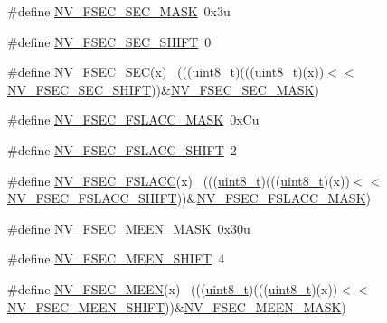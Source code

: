 \begin{DoxyCompactItemize}
\item 
\#define \hyperlink{group___n_v___register___masks_gab159c721c6cde1f629b630c573da8ea9}{N\+V\+\_\+\+F\+S\+E\+C\+\_\+\+S\+E\+C\+\_\+\+M\+A\+SK}~0x3u
\item 
\#define \hyperlink{group___n_v___register___masks_ga92a819b24b0472a83857ddd2d950ab08}{N\+V\+\_\+\+F\+S\+E\+C\+\_\+\+S\+E\+C\+\_\+\+S\+H\+I\+FT}~0
\item 
\#define \hyperlink{group___n_v___register___masks_gad5a8a12d54435f49c62b7f43b53513a8}{N\+V\+\_\+\+F\+S\+E\+C\+\_\+\+S\+EC}(x)                                                  ~(((\hyperlink{_p_e___types_8h_aba7bc1797add20fe3efdf37ced1182c5}{uint8\+\_\+t})(((\hyperlink{_p_e___types_8h_aba7bc1797add20fe3efdf37ced1182c5}{uint8\+\_\+t})(x))$<$$<$\hyperlink{group___n_v___register___masks_ga92a819b24b0472a83857ddd2d950ab08}{N\+V\+\_\+\+F\+S\+E\+C\+\_\+\+S\+E\+C\+\_\+\+S\+H\+I\+FT}))\&\hyperlink{group___n_v___register___masks_gab159c721c6cde1f629b630c573da8ea9}{N\+V\+\_\+\+F\+S\+E\+C\+\_\+\+S\+E\+C\+\_\+\+M\+A\+SK})
\item 
\#define \hyperlink{group___n_v___register___masks_ga8fd3b6696c82aa96017fe25be34d19c9}{N\+V\+\_\+\+F\+S\+E\+C\+\_\+\+F\+S\+L\+A\+C\+C\+\_\+\+M\+A\+SK}~0x\+Cu
\item 
\#define \hyperlink{group___n_v___register___masks_gaba549ee99b8ca1af3531eafd5746f6b6}{N\+V\+\_\+\+F\+S\+E\+C\+\_\+\+F\+S\+L\+A\+C\+C\+\_\+\+S\+H\+I\+FT}~2
\item 
\#define \hyperlink{group___n_v___register___masks_gae4a6264735dd8537ff6a3a993a8c50d8}{N\+V\+\_\+\+F\+S\+E\+C\+\_\+\+F\+S\+L\+A\+CC}(x)                                            ~(((\hyperlink{_p_e___types_8h_aba7bc1797add20fe3efdf37ced1182c5}{uint8\+\_\+t})(((\hyperlink{_p_e___types_8h_aba7bc1797add20fe3efdf37ced1182c5}{uint8\+\_\+t})(x))$<$$<$\hyperlink{group___n_v___register___masks_gaba549ee99b8ca1af3531eafd5746f6b6}{N\+V\+\_\+\+F\+S\+E\+C\+\_\+\+F\+S\+L\+A\+C\+C\+\_\+\+S\+H\+I\+FT}))\&\hyperlink{group___n_v___register___masks_ga8fd3b6696c82aa96017fe25be34d19c9}{N\+V\+\_\+\+F\+S\+E\+C\+\_\+\+F\+S\+L\+A\+C\+C\+\_\+\+M\+A\+SK})
\item 
\#define \hyperlink{group___n_v___register___masks_ga02f5aa86e1f5bceefd0378fa736d5656}{N\+V\+\_\+\+F\+S\+E\+C\+\_\+\+M\+E\+E\+N\+\_\+\+M\+A\+SK}~0x30u
\item 
\#define \hyperlink{group___n_v___register___masks_ga13adfbdf46af9e59b446d17ce90b49c1}{N\+V\+\_\+\+F\+S\+E\+C\+\_\+\+M\+E\+E\+N\+\_\+\+S\+H\+I\+FT}~4
\item 
\#define \hyperlink{group___n_v___register___masks_gafb2cb85643ad7aa0997ed49baa90379f}{N\+V\+\_\+\+F\+S\+E\+C\+\_\+\+M\+E\+EN}(x)                                                ~(((\hyperlink{_p_e___types_8h_aba7bc1797add20fe3efdf37ced1182c5}{uint8\+\_\+t})(((\hyperlink{_p_e___types_8h_aba7bc1797add20fe3efdf37ced1182c5}{uint8\+\_\+t})(x))$<$$<$\hyperlink{group___n_v___register___masks_ga13adfbdf46af9e59b446d17ce90b49c1}{N\+V\+\_\+\+F\+S\+E\+C\+\_\+\+M\+E\+E\+N\+\_\+\+S\+H\+I\+FT}))\&\hyperlink{group___n_v___register___masks_ga02f5aa86e1f5bceefd0378fa736d5656}{N\+V\+\_\+\+F\+S\+E\+C\+\_\+\+M\+E\+E\+N\+\_\+\+M\+A\+SK})
$$
\end{DoxyCompactItemize}
